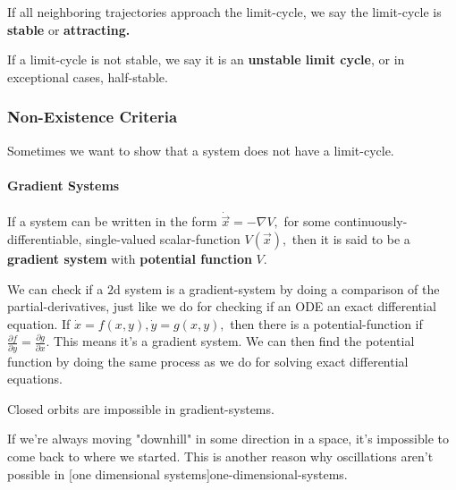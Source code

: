 \documentclass{article}
\begin{document}
\begin{definition}
If all neighboring \@{trajectories} approach the \@{limit-cycle}, we say the \@{limit-cycle} is \textbf{stable} or \textbf{attracting.}
\end{definition}

\begin{definition}
If a \@{limit-cycle} is not stable, we say it is an \textbf{unstable limit cycle}, or in exceptional cases, half-stable.
\end{definition}

\subsubsection{Non-Existence Criteria}

Sometimes we want to show that a \@{system} does not have a \@{limit-cycle}.

\paragraph{Gradient Systems}

\begin{definition}
If a \@{system} can be written in the form $\dot{\vec{x}} = - \nabla V,$ for some \@{continuously-differentiable}, single-valued \@{scalar-function} $V(\vec{x}),$ then it is said to be a \textbf{gradient system} with \textbf{potential function} $V.$
\end{definition}

We can check if a $2$d system is a \@{gradient-system} by doing a comparison of the \@{partial-derivatives}, just like we do for checking if an ODE an exact differential equation. If $\dot{x} = f(x,y), \dot{y} = g(x,y),$ then there is a \@{potential-function} if $\frac{\partial f}{\partial y} = \frac{\partial g}{\partial x}.$ This means it's a gradient system. We can then find the potential function by doing the same process as we do for solving exact differential equations.

\begin{theorem}\label{closed-orbits-impossible-in-gradient-systems}
Closed orbits are impossible in \@{gradient-systems}.
\end{theorem}

\begin{intuition}
If we're always moving "downhill" in some direction in a space, it's impossible to come back to where we started. This is another reason why oscillations aren't possible in \@[one dimensional systems]{one-dimensional-systems}.
\end{intuition}
\end{document}
